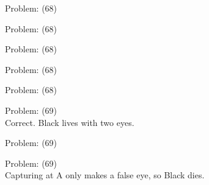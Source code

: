 \documentclass[11pt]{article}
\begin{document}
\begin{minipage}[t]{0.5\textwidth}
  {\centering
  
  Problem: (68)\\
  
  }
\end{minipage}
\begin{minipage}[t]{0.5\textwidth}
  {\centering
  
  Problem: (68)\\
  
  }
\end{minipage}
\begin{minipage}[t]{0.5\textwidth}
  {\centering
  
  Problem: (68)\\
  
  }
\end{minipage}
\begin{minipage}[t]{0.5\textwidth}
  {\centering
  
  Problem: (68)\\
  
  }
\end{minipage}
\begin{minipage}[t]{0.5\textwidth}
  {\centering
  
  Problem: (68)\\
  
  }
\end{minipage}
\begin{minipage}[t]{0.5\textwidth}
  {\centering
  
  Problem: (69)\\
  Correct. Black lives with two eyes.\\
  }
\end{minipage}
\begin{minipage}[t]{0.5\textwidth}
  {\centering
  
  Problem: (69)\\
  
  }
\end{minipage}
\begin{minipage}[t]{0.5\textwidth}
  {\centering
  
  Problem: (69)\\
  Capturing at A only makes a false eye, so Black dies.\\
  }
\end{minipage}
\end{document}

